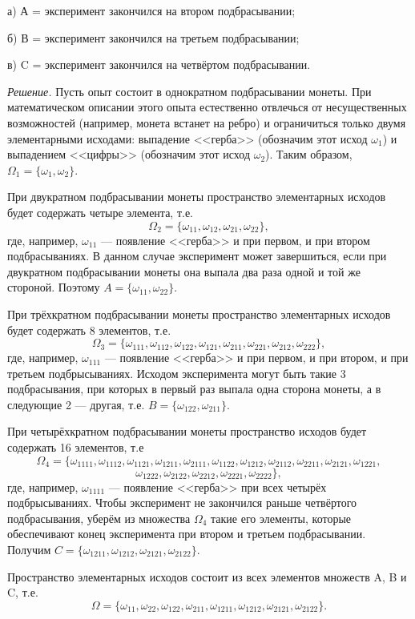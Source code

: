 \documentclass{book}
\begin{document}
а) А = { эксперимент закончился на втором подбрасывании};

б) В = { эксперимент закончился на третьем подбрасывании};

в) C = { эксперимент закончился на четвёртом подбрасывании}.

\textit{Решение.}  Пусть опыт состоит в однократном подбрасывании монеты. При математическом описании этого опыта естественно отвлечься от несущественных возможностей (например, монета встанет на ребро) и ограничиться только двумя элементарными исходами: выпадение <<герба>> (обозначим этот исход $\omega_1$) и выпадением <<цифры>> (обозначим этот исход $\omega_2$). Таким образом, $\Omega_1=\{\omega_1, \omega_2\}$.

При двукратном подбрасывании монеты пространство элементарных исходов будет содержать четыре элемента, т.е. $$\Omega_2=\{\omega_{11}, \omega_{12}, \omega_{21}, \omega_{22}\},$$ где, например, $\omega_{11}$ --- появление <<герба>> и при первом, и при втором подбрасываниях. В данном случае эксперимент может завершиться, если при двукратном подбрасывании монеты она выпала два раза одной и той же стороной. Поэтому $A=\{\omega_{11}, \omega_{22}\}$.

При трёхкратном подбрасывании монеты пространство элементарных исходов будет содержать 8 элементов, т.е. $$\Omega_3=\{\omega_{111}, \omega_{112}, \omega_{122}, \omega_{121}, \omega_{211}, \omega_{221}, \omega_{212}, \omega_{222}\},$$ где, например, $\omega_{111}$ --- появление <<герба>> и при первом, и при втором, и при третьем подбрысываниях. Исходом эксперимента могут быть такие 3 подбрасывания, при которых в первый раз выпала одна сторона монеты, а в следующие 2 --- другая, т.е. $B=\{\omega_{122}, \omega_{211}\}$.

При четырёхкратном подбрасывании монеты пространство исходов будет содержать 16 элементов, т.е $$\Omega_4=\{\omega_{1111}, \omega_{1112}, \omega_{1121}, \omega_{1211}, \omega_{2111}, \omega_{1122}, \omega_{1212}, \omega_{2112}, \omega_{2211}, \omega_{2121}, \omega_{1221},$$$$\omega_{1222}, \omega_{2122}, \omega_{2212}, \omega_{2221}, \omega_{2222}\},$$ где, например, $\omega_{1111}$ --- появление <<герба>> при всех четырёх подбрысываниях. Чтобы эксперимент не закончился раньше четвёртого подбрасывания, уберём из множества $\Omega_4$ такие его элементы, которые обеспечивают конец эксперимента при втором и третьем подбрасывании. Получим $C=\{\omega_{1211}, \omega_{1212}, \omega_{2121}, \omega_{2122}\}$.

Пространство элементарных исходов состоит из всех элементов множеств A, B и C, т.е. $$\Omega=\{\omega_{11}, \omega_{22}, \omega_{122}, \omega_{211}, \omega_{1211}, \omega_{1212}, \omega_{2121}, \omega_{2122}\}.$$
\end{document}
